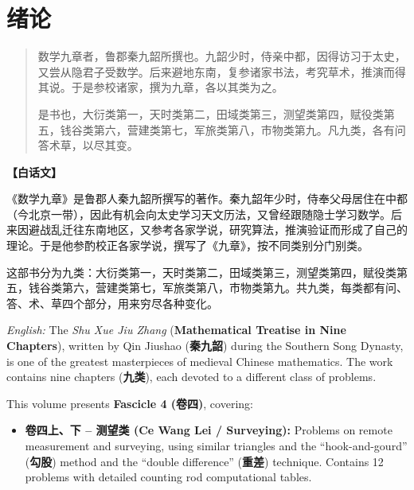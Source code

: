 \documentclass[11pt,a4paper]{article}
\begin{document}
\section*{绪论}

\begin{originaltext}
\begin{quote}
\textcolor{origcolor}{%
数学九章者，鲁郡秦九韶所撰也。九韶少时，侍亲中都，因得访习于太史，又尝从隐君子受数学。后来避地东南，复参诸家书法，考究草术，推演而得其说。于是参校诸家，撰为九章，各以其类为之。

是书也，大衍类第一，天时类第二，田域类第三，测望类第四，赋役类第五，钱谷类第六，营建类第七，军旅类第八，市物类第九。凡九类，各有问答术草，以尽其变。
}
\end{quote}
\end{originaltext}

\begin{moderntext}
\textbf{【白话文】}

《数学九章》是鲁郡人秦九韶所撰写的著作。秦九韶年少时，侍奉父母居住在中都（今北京一带），因此有机会向太史学习天文历法，又曾经跟随隐士学习数学。后来因避战乱迁往东南地区，又参考各家学说，研究算法，推演验证而形成了自己的理论。于是他参酌校正各家学说，撰写了《九章》，按不同类别分门别类。

这部书分为九类：大衍类第一，天时类第二，田域类第三，测望类第四，赋役类第五，钱谷类第六，营建类第七，军旅类第八，市物类第九。共九类，每类都有问、答、术、草四个部分，用来穷尽各种变化。
\end{moderntext}

\textit{English:} The \textit{Shu Xue Jiu Zhang} (\textbf{Mathematical Treatise in Nine Chapters}), 
written by Qin Jiushao (\textbf{秦九韶}) during the Southern Song Dynasty, 
is one of the greatest masterpieces of medieval Chinese mathematics. The work 
contains nine chapters (\textbf{九类}), each devoted to a different class of problems.

This volume presents \textbf{Fascicle 4 (卷四)}, covering:

\begin{itemize}
  \item \textbf{卷四上、下 -- 测望类 (Ce Wang Lei / Surveying):} Problems on remote 
    measurement and surveying, using similar triangles and the ``hook-and-gourd'' 
    (\textbf{勾股}) method and the ``double difference'' (\textbf{重差}) technique. 
    Contains 12 problems with detailed counting rod computational tables.
\end{itemize}
\end{document}
